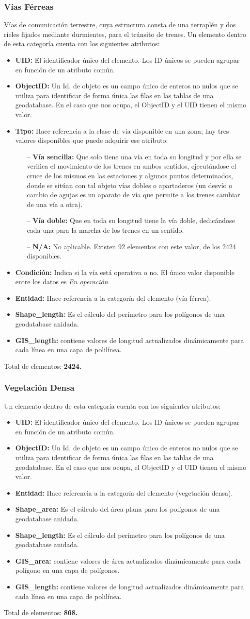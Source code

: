 \documentclass[10pt,letterpaper]{article}
\newcommand{\descripcion}{Un elemento dentro de esta categoría cuenta con los siguientes atributos:}
\newcommand{\total}{Total de elementos: }
\newcommand{\UID}{\textbf{UID:} El identificador único del elemento. Los ID únicos se pueden agrupar en función de un atributo común.}
\newcommand{\OID}{\textbf{ObjectID:} Un Id. de objeto es un campo único de enteros no nulos que se utiliza para identificar de forma única las filas en las tablas de una geodatabase. En el caso que nos ocupa, el ObjectID y el UID tienen el mismo valor.}
\newcommand{\ent}{\textbf{Entidad:} Hace referencia a la categoría del elemento }
\newcommand{\SHA}{\textbf{Shape\_area:} Es el cálculo del área plana para los polígonos de una geodatabase anidada.}
\newcommand{\SHL}{\textbf{Shape\_length:} Es el cálculo del perímetro para los polígonos de una geodatabase anidada.}
\newcommand{\GISA}{\textbf{GIS\_area:} contiene valores de área actualizados dinámicamente para cada polígono en una capa de polígonos.}
\newcommand{\GISL}{\textbf{GIS\_length:} contiene valores de longitud actualizados dinámicamente para cada línea en una capa de polilínea.}
\begin{document}
\subsubsection{Vías Férreas}
Vías de comunicación terrestre, cuya estructura consta de una terraplén y dos rieles fijados mediante durmientes, para el tránsito de trenes. \descripcion
\begin{itemize}
	\item \UID
	\item \OID
	\item \textbf{Tipo:} Hace referencia a la clase de vía disponible en una zona; hay tres valores disponibles que puede adquirir ese atributo:
	\begin{itemize}
		\item[--] \textbf{Vía sencilla:} Que solo tiene una vía en toda su longitud y por ella se verifica el movimiento de los trenes en ambos sentidos, ejecutándose el cruce de los mismos en las estaciones y algunos puntos determinados, donde se sitúan con tal objeto vías dobles o apartaderos (un desvío o cambio de agujas es un aparato de vía que permite a los trenes cambiar de una vía a otra).
		\item[--] \textbf{Vía doble:} Que en toda su longitud tiene la vía doble, dedicándose cada una para la marcha de los trenes en un sentido.
		\item[--] \textbf{N/A:} No aplicable. Existen 92 elementos con este valor, de los 2424 disponibles. 
	\end{itemize}
	\item \textbf{Condición:} Indica si la vía está operativa o no. El único valor disponible entre los datos es \emph{En operación}.
	\item \ent (vía férrea).
	\item \SHL
	\item \GISL
\end{itemize}
\total \textbf{2424.}

\subsubsection{Vegetación Densa}
\descripcion
\begin{itemize}
	\item \UID
	\item \OID
	\item \ent (vegetación densa).
	\item \SHA
	\item \SHL
	\item \GISA
	\item \GISL
\end{itemize}
\total \textbf{868.}
\end{document}
